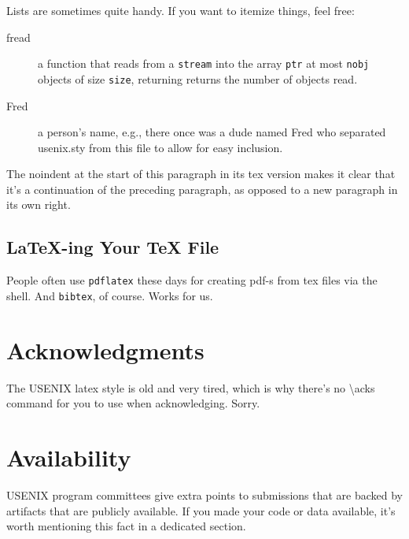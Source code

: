 Lists are sometimes quite handy. If you want to itemize things, feel
free:

\begin{description}
  
\item[fread] a function that reads from a \texttt{stream} into the
  array \texttt{ptr} at most \texttt{nobj} objects of size
  \texttt{size}, returning returns the number of objects read.

\item[Fred] a person's name, e.g., there once was a dude named Fred
  who separated usenix.sty from this file to allow for easy
  inclusion.
\end{description}

\noindent
The noindent at the start of this paragraph in its tex version makes
it clear that it's a continuation of the preceding paragraph, as
opposed to a new paragraph in its own right.


\subsection{LaTeX-ing Your TeX File}

People often use \texttt{pdflatex} these days for creating pdf-s from
tex files via the shell. And \texttt{bibtex}, of course. Works for us.

\section*{Acknowledgments}

The USENIX latex style is old and very tired, which is why
there's no \textbackslash{}acks command for you to use when
acknowledging. Sorry.

\section*{Availability}

USENIX program committees give extra points to submissions that are
backed by artifacts that are publicly available. If you made your code
or data available, it's worth mentioning this fact in a dedicated
section.







